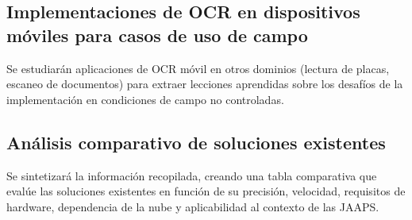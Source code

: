\subsection{Implementaciones de OCR en dispositivos móviles para casos de uso de campo}
\label{ssec:ocr_movil_campo}
Se estudiarán aplicaciones de OCR móvil en otros dominios (lectura de placas, escaneo de documentos) para extraer lecciones aprendidas sobre los desafíos de la implementación en condiciones de campo no controladas.

\subsection{Análisis comparativo de soluciones existentes}
\label{ssec:analisis_comparativo}
Se sintetizará la información recopilada, creando una tabla comparativa que evalúe las soluciones existentes en función de su precisión, velocidad, requisitos de hardware, dependencia de la nube y aplicabilidad al contexto de las JAAPS.